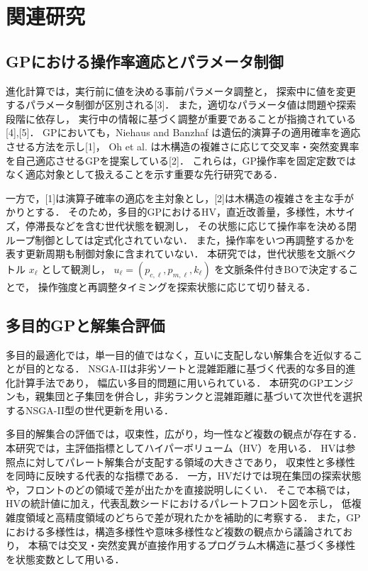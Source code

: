 \documentclass[a4paper,10pt,twocolumn]{ltjsarticle}
\begin{document}
\section{関連研究}

\subsection{GPにおける操作率適応とパラメータ制御}

進化計算では，実行前に値を決める事前パラメータ調整と，
探索中に値を変更するパラメータ制御が区別される[3]．
また，適切なパラメータ値は問題や探索段階に依存し，
実行中の情報に基づく調整が重要であることが指摘されている[4],[5]．
GPにおいても，Niehaus and Banzhaf は遺伝的演算子の適用確率を適応させる方法を示し[1]，
Oh et al. は木構造の複雑さに応じて交叉率・突然変異率を自己適応させるGPを提案している[2]．
これらは，GP操作率を固定定数ではなく適応対象として扱えることを示す重要な先行研究である．

一方で，[1]は演算子確率の適応を主対象とし，[2]は木構造の複雑さを主な手がかりとする．
そのため，多目的GPにおけるHV，直近改善量，多様性，木サイズ，停滞長などを含む世代状態を観測し，
その状態に応じて操作率を決める閉ループ制御としては定式化されていない．
また，操作率をいつ再調整するかを表す更新周期も制御対象に含まれていない．
本研究では，世代状態を文脈ベクトル \(x_\ell\) として観測し，
\(u_\ell=(p_{c,\ell},p_{m,\ell},k_\ell)\) を文脈条件付きBOで決定することで，
操作強度と再調整タイミングを探索状態に応じて切り替える．

\subsection{多目的GPと解集合評価}

多目的最適化では，単一目的値ではなく，互いに支配しない解集合を近似することが目的となる．
NSGA-IIは非劣ソートと混雑距離に基づく代表的な多目的進化計算手法であり，
幅広い多目的問題に用いられている\cite{verma2021}．
本研究のGPエンジンも，親集団と子集団を併合し，非劣ランクと混雑距離に基づいて次世代を選択するNSGA-II型の世代更新を用いる．

多目的解集合の評価では，収束性，広がり，均一性など複数の観点が存在する\cite{li2019}．
本研究では，主評価指標としてハイパーボリューム（HV）を用いる．
HVは参照点に対してパレート解集合が支配する領域の大きさであり，
収束性と多様性を同時に反映する代表的な指標である\cite{guerreiro2021}．
一方，HVだけでは現在集団の探索状態や，フロントのどの領域で差が出たかを直接説明しにくい．
そこで本稿では，HVの統計値に加え，代表乱数シードにおけるパレートフロント図を示し，
低複雑度領域と高精度領域のどちらで差が現れたかを補助的に考察する．
また，GPにおける多様性は，構造多様性や意味多様性など複数の観点から議論されており\cite{burlacu2024}，
本稿では交叉・突然変異が直接作用するプログラム木構造に基づく多様性を状態変数として用いる．
\end{document}

